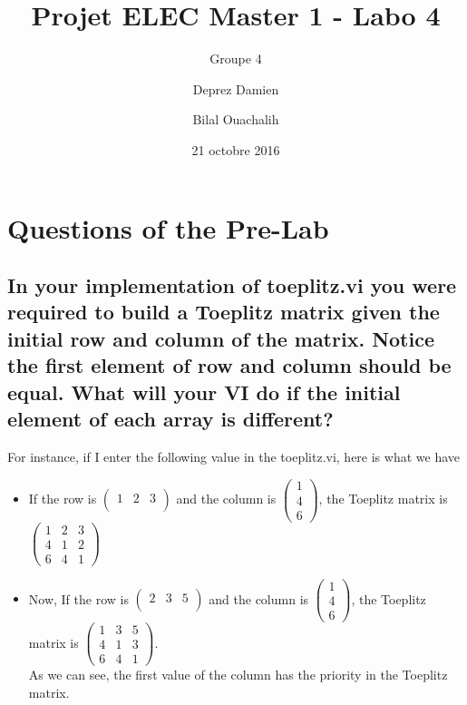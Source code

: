 \documentclass[frenchb, oneside, headings=normal]{scrartcl}
\begin{document}
\title{Projet ELEC Master 1 - Labo 4}
\subtitle{Groupe 4}
\author{Deprez Damien \and Bilal Ouachalih }
\date{21 octobre 2016}
\maketitle


\section{Questions of the Pre-Lab}

\subsection{In your implementation of toeplitz.vi you were required to build a Toeplitz matrix given the initial row and column of the matrix. Notice the first element of row and column should be equal. What will
your VI do if the initial element of each array is different?} 


For instance, if I enter the following value in the toeplitz.vi, here is what we have\\
\begin{itemize}
\item If the row is $\begin{pmatrix}1 & 2 & 3\\ \end{pmatrix}$
	  and the column is $\begin{pmatrix}1\\4\\6 \end{pmatrix}$,
 	  the Toeplitz matrix is $\begin{pmatrix}1 & 2 & 3\\4 & 1 & 2\\6 & 4 & 1
      \end{pmatrix}$\\

\item Now, If the row is $\begin{pmatrix}2 & 3 & 5\\ \end{pmatrix}$
	  and the column is $\begin{pmatrix}1\\4\\6 \end{pmatrix}$,
 	  the Toeplitz matrix is $\begin{pmatrix}1 & 3 & 5\\4 & 1 & 3\\6 & 4 & 1
      \end{pmatrix}$.\newline \\ As we can see, the first value of the column     	  has the priority in the Toeplitz matrix.

\end{itemize}
\end{document}
